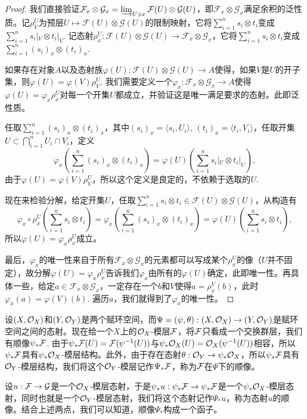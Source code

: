 \begin{proof}
我们直接验证$\mathcal{F}_x\otimes\mathcal{G}_x=\varinjlim_{U\ni x} \mathcal{F}(U)\otimes\mathcal{G}(U)$，即$\mathcal{F}_x\otimes\mathcal{G}_x$满足余积的泛性质。记$\rho^U_V$为预层$U\mapsto \mathcal{F}(U)\otimes \mathcal{G}(U)$的限制映射，它将$\sum_{i=1}^n s_i\otimes t_i$变成$\sum_{i=1}^n s_i|_V\otimes t_i|_V$. 记态射$\rho^U_x:\mathcal{F}(U)\otimes \mathcal{G}(U)\to \mathcal{F}_x\otimes\mathcal{G}_x$，它将$\sum_{i=1}^n s_i\otimes t_i$变成$\sum_{i=1}^n (s_i)_x\otimes (t_i)_x$.

如果存在对象$A$以及态射族$\varphi(U):\mathcal{F}(U)\otimes \mathcal{G}(U)\to A$使得，如果$V$是$U$的开子集，则$\varphi(U)=\varphi(V)\rho^U_V$. 我们需要定义一个$\varphi_x:\mathcal{F}_x\otimes\mathcal{G}_x\to A$使得$\varphi(U)=\varphi_x \rho^U_x$对每一个开集$U$都成立，并验证这是唯一满足要求的态射。此即泛性质。

任取$\sum_{i=1}^n (s_i)_x\otimes (t_i)_x$，其中$(s_i)_x=\langle s_i,U_i\rangle$, $(t_i)_x=\langle t_i,V_i\rangle$，任取开集$U\subset \bigcap_{i=1}^n U_i\cap V_i$，定义
\[
	\varphi_x\left(\sum_{i=1}^n (s_i)_x\otimes (t_i)_x\right)=\varphi(U)\left(\sum_{i=1}^n s_i|_U\otimes t_i|_U\right),
\]
由于$\varphi(U)=\varphi(V)\rho^U_V$，所以这个定义是良定的，不依赖于选取的$U$.

现在来检验分解，给定开集$U$，任取$\sum_{i=1}^n s_i\otimes t_i\in \mathcal{F}(U)\otimes \mathcal{G}(U)$，从构造有
\[
	\varphi_x\circ \rho^U_x\left(\sum_{i=1}^n s_i\otimes t_i\right)=\varphi_x\left(\sum_{i=1}^n (s_i)_x\otimes (t_i)_x\right)=\varphi(U)\left(\sum_{i=1}^n s_i\otimes t_i\right),
\]
所以$\varphi(U)=\varphi_x \rho^U_x$成立。

最后，$\varphi_x$的唯一性来自于所有$\mathcal{F}_x\otimes\mathcal{G}_x$的元素都可以写成某个$\rho_x^U$的像（$U$并不固定），故分解$\varphi(U)=\varphi_x \rho^U_x$告诉我们$\varphi_x$由所有的$\varphi(U)$确定，此即唯一性。再具体一些，给定$a\in \mathcal{F}_x\otimes\mathcal{G}_x$，一定存在一个$b$和$V$使得$a=\rho^V_x(b)$，此时$\varphi_x(a)=\varphi(V)(b)$. 遍历$a$，我们就得到了$\varphi_x$的唯一性。
\end{proof}

\begin{para}[顺像]
设$(X,\mathcal{O}_X)$和$(Y,\mathcal{O}_Y)$是两个赋环空间，而$\Psi=(\psi,\theta):(X,\mathcal{O}_X)\to (Y,\mathcal{O}_Y)$是赋环空间之间的态射。现在给一个$X$上的$\mathcal{O}_X$-模层$\mathcal{F}$，将$\mathcal{F}$只看成一个交换群层，我们有顺像$\psi_*\mathcal{F}$. 由于$\psi_*\mathcal{F}(U)=\mathcal{F}(\psi^{-1}(U))$与$\psi_*\mathcal{O}_X(U)=\mathcal{O}_X(\psi^{-1}(U))$相容，所以$\psi_*\mathcal{F}$具有$\psi_*\mathcal{O}_X$-模层结构。此外，由于存在态射$\theta:\mathcal{O}_Y\to \psi_*\mathcal{O}_X$，所以$\psi_*\mathcal{F}$具有$\mathcal{O}_Y$-模层结构，我们将这个$\mathcal{O}_Y$-模层记作$\Psi_*\mathcal{F}$，称为$\mathcal{F}$在$\Psi$下的顺像。

设$u:\mathcal{F}\to\mathcal{G}$是一个$\mathcal{O}_X$-模层态射，于是$\psi_*u:\psi_*\mathcal{F}\to\psi_*\mathcal{F}$是一个$\psi_*\mathcal{O}_X$-模层态射，同时也就是一个$\mathcal{O}_Y$-模层态射，我们将这个态射记作$\Psi_*u$，称为态射$u$的顺像。结合上述两点，我们可以知道，顺像$\Psi_*$构成一个函子。
\end{para}

